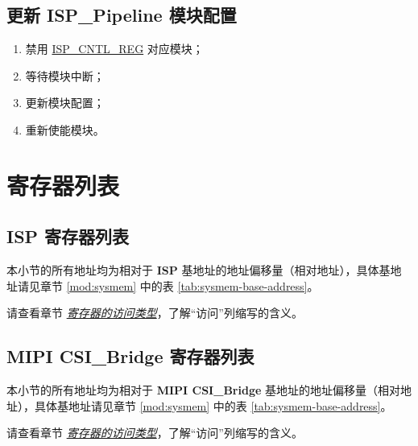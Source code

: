 \documentclass[main\_\_CN.tex]{subfiles}
\begin{document}
\subsection{更新 ISP\_Pipeline 模块配置}
\begin{enumerate}
    \item 禁用 \hyperref[regdesc:ISPCNTLREG]{ISP\_CNTL\_REG} 对应模块；
    \item 等待模块中断；
    \item 更新模块配置；
    \item 重新使能模块。
\end{enumerate}





\newpage
\hypertarget{isp-reg-summ}{}
\section{寄存器列表}
\label{sec:isp-reg-summ}

\subsection{ISP 寄存器列表}

本小节的所有地址均为相对于 \textbf{ISP} 基地址的地址偏移量（相对地址），具体基地址请见章节 \ref{mod:sysmem} \textit{} 中的表 \ref{tab:sysmem-base-address}。

请查看章节 \hyperref[glossary-access-types]{\textit{寄存器的访问类型}}，了解“访问”列缩写的含义。




\subsection{MIPI CSI\_Bridge 寄存器列表}

本小节的所有地址均为相对于 \textbf{MIPI CSI\_Bridge} 基地址的地址偏移量（相对地址），具体基地址请见章节 \ref{mod:sysmem} \textit{} 中的表 \ref{tab:sysmem-base-address}。

请查看章节 \hyperref[glossary-access-types]{\textit{寄存器的访问类型}}，了解“访问”列缩写的含义。
\end{document}
